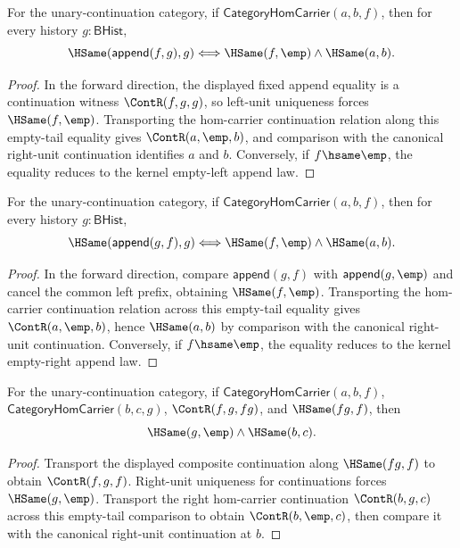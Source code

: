 \begin{theorem}
\label{thm:category-hom-carrier-right-append-fixed-identity}
For the unary-continuation category, if $\mathsf{CategoryHomCarrier}(a,b,f)$,
then for every history $g:\mathsf{BHist}$,
$$
\HSame(\mathsf{append}(f,g),g)
\Longleftrightarrow
\HSame(f,\emp)\wedge\HSame(a,b).
$$
\end{theorem}
\begin{proof}
In the forward direction, the displayed fixed append equality is a continuation
witness $\ContR(f,g,g)$, so left-unit uniqueness forces $\HSame(f,\emp)$.
Transporting the hom-carrier continuation relation along this empty-tail
equality gives $\ContR(a,\emp,b)$, and comparison with the canonical right-unit
continuation identifies $a$ and $b$. Conversely, if $f\hsame\emp$, the equality
reduces to the kernel empty-left append law.
\end{proof}

\begin{theorem}
\label{thm:category-hom-carrier-left-append-fixed-identity}
For the unary-continuation category, if $\mathsf{CategoryHomCarrier}(a,b,f)$,
then for every history $g:\mathsf{BHist}$,
$$
\HSame(\mathsf{append}(g,f),g)
\Longleftrightarrow
\HSame(f,\emp)\wedge\HSame(a,b).
$$
\end{theorem}
\begin{proof}
In the forward direction, compare $\mathsf{append}(g,f)$ with
$\mathsf{append}(g,\emp)$ and cancel the common left prefix, obtaining
$\HSame(f,\emp)$. Transporting the hom-carrier continuation relation across
this empty-tail equality gives $\ContR(a,\emp,b)$, hence $\HSame(a,b)$ by
comparison with the canonical right-unit continuation. Conversely, if
$f\hsame\emp$, the equality reduces to the kernel empty-right append law.
\end{proof}

\begin{theorem}
\label{thm:category-hom-carrier-comp-left-tail-fixed-right-identity}
For the unary-continuation category, if
$\mathsf{CategoryHomCarrier}(a,b,f)$,
$\mathsf{CategoryHomCarrier}(b,c,g)$, $\ContR(f,g,fg)$, and
$\HSame(fg,f)$, then
$$
\HSame(g,\emp)\wedge\HSame(b,c).
$$
\end{theorem}
\begin{proof}
Transport the displayed composite continuation along $\HSame(fg,f)$ to obtain
$\ContR(f,g,f)$. Right-unit uniqueness for continuations forces
$\HSame(g,\emp)$. Transport the right hom-carrier continuation
$\ContR(b,g,c)$ across this empty-tail comparison to obtain
$\ContR(b,\emp,c)$, then compare it with the canonical right-unit continuation
at $b$.
\end{proof}

